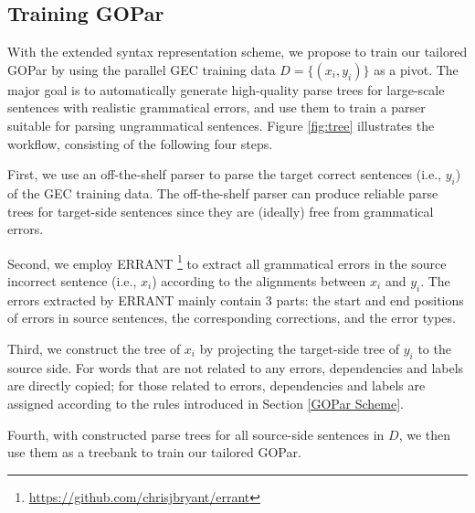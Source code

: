 \documentclass[11pt]{article}
\begin{document}
\subsection{Training GOPar} \label{GOPar Data}  

With the extended syntax representation scheme, we propose to train our tailored GOPar by using the parallel GEC training data $D=\{(x_i, y_i)\}$ as a pivot. 
The major goal is to automatically generate high-quality parse trees for large-scale sentences with realistic grammatical errors, and use them to train a parser suitable for parsing ungrammatical sentences. 
Figure \ref{fig:tree} illustrates the workflow, consisting of the following four steps. 



First, we use an off-the-shelf parser to parse the target correct sentences (i.e., $y_i$) of the GEC training data. The off-the-shelf parser can produce reliable parse trees for target-side sentences since they are (ideally) free from grammatical errors.

Second, we employ ERRANT \citep{bryant2017automatic}\footnote{\url{https://github.com/chrisjbryant/errant}} 
to extract all grammatical errors in the source incorrect sentence (i.e., $x_i$) according to the alignments  between $x_i$ and $y_i$. The errors extracted by ERRANT mainly contain 3 parts: the start and end positions of errors in source sentences, the corresponding corrections, and the error types.


Third, we construct the tree of $x_i$ by projecting the target-side tree of $y_i$ to the source side. For words that are not related to any errors, dependencies and labels are directly copied; for those related to errors,  dependencies and labels are assigned according to the rules introduced in Section \ref{GOPar Scheme}. 



Fourth,  with constructed parse trees for all source-side sentences in $D$,  we then use them as a treebank to train our tailored GOPar. 
\end{document}
